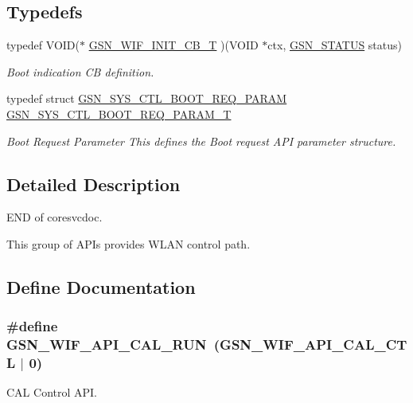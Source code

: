 \subsection*{Typedefs}
\begin{DoxyCompactItemize}
\item 
typedef VOID($\ast$ \hyperlink{a00636_gad3465a5565359704a4c7d30e8e3ff127}{GSN\_\-WIF\_\-INIT\_\-CB\_\-T} )(VOID $\ast$ctx, \hyperlink{a00660_gada5951904ac6110b1fa95e51a9ddc217}{GSN\_\-STATUS} status)
\begin{DoxyCompactList}\small\item\em Boot indication CB definition. \end{DoxyCompactList}\item 
typedef struct \hyperlink{a00247}{GSN\_\-SYS\_\-CTL\_\-BOOT\_\-REQ\_\-PARAM} \hyperlink{a00636_ga131a12dab3ad56372462964539832fe9}{GSN\_\-SYS\_\-CTL\_\-BOOT\_\-REQ\_\-PARAM\_\-T}
\begin{DoxyCompactList}\small\item\em Boot Request Parameter This defines the Boot request API parameter structure. \end{DoxyCompactList}\end{DoxyCompactItemize}


\subsection{Detailed Description}
END of coresvcdoc.

This group of APIs provides WLAN control path. 

\subsection{Define Documentation}
\hypertarget{a00636_ga65249c647288361df35fafec69154f96}{
\subsubsection[{GSN\_\-WIF\_\-API\_\-CAL\_\-RUN}]{\setlength{\rightskip}{0pt plus 5cm}\#define GSN\_\-WIF\_\-API\_\-CAL\_\-RUN~(GSN\_\-WIF\_\-API\_\-CAL\_\-CTL $|$ 0)}}
\label{a00636_ga65249c647288361df35fafec69154f96}


CAL Control API. 


